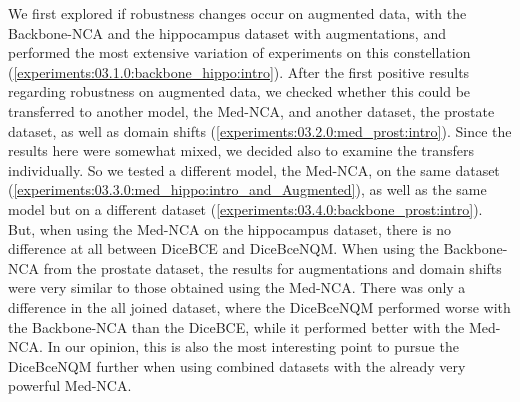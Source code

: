 We first explored if robustness changes occur on augmented data, with the Backbone-NCA and the hippocampus dataset with augmentations, and performed the most extensive variation of experiments on this constellation (\autoref{experiments:03.1.0:backbone_hippo:intro}). After the first positive results regarding robustness on augmented data, we checked whether this could be transferred to another model, the Med-NCA, and another dataset, the prostate dataset, as well as domain shifts (\autoref{experiments:03.2.0:med_prost:intro}). Since the results here were somewhat mixed, we decided also to examine the transfers individually. So we tested a different model, the Med-NCA, on the same dataset (\autoref{experiments:03.3.0:med_hippo:intro_and_Augmented}), as well as the same model but on a different dataset (\autoref{experiments:03.4.0:backbone_prost:intro}).
But, when using the Med-NCA on the hippocampus dataset, there is no difference at all between DiceBCE and DiceBceNQM. When using the Backbone-NCA from the prostate dataset, the results for augmentations and domain shifts were very similar to those obtained using the Med-NCA. There was only a difference in the all joined dataset, where the DiceBceNQM performed worse with the Backbone-NCA than the DiceBCE, while it performed better with the Med-NCA. In our opinion, this is also the most interesting point to pursue the DiceBceNQM further when using combined datasets with the already very powerful Med-NCA.

